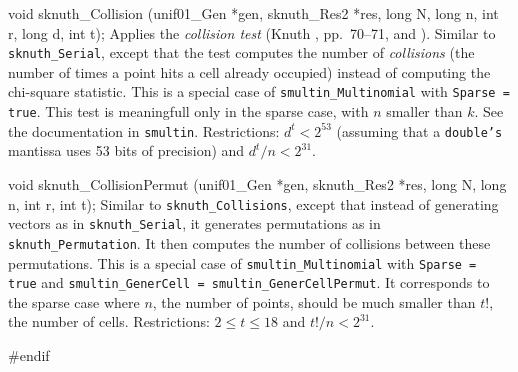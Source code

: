 void sknuth_Collision (unif01_Gen *gen, sknuth_Res2 *res,
                       long N, long n, int r, long d, int t);
\endcode
  \tab
   Applies the {\em collision test\/}
  (Knuth \cite{rKNU98a},  pp.~70--71, and \cite{rLEC02c}).
   Similar to {\tt sknuth\_Serial}, except that the test computes the
   number of {\em collisions\/} (the number of times a point hits a cell
   already occupied) instead of computing the chi-square statistic.
   This is a special case of {\tt smultin\_Multinomial} with
   {\tt Sparse = true}.  This test is meaningfull only in the sparse case,
   with $n$ smaller than $k$.  See the documentation in {\tt smultin}.
   Restrictions: $d^t < 2^{53}$ (assuming that a {\tt double's} mantissa
   uses 53 bits of precision) and $d^{t}/n < 2^{31}$.
  \endtab
\code


void sknuth_CollisionPermut (unif01_Gen *gen, sknuth_Res2 *res,
                             long N, long n, int r, int t);
\endcode
  \tab
   Similar to {\tt sknuth\_Collisions},
   except that
   instead of generating  vectors as in {\tt sknuth\_Serial},
   it generates permutations as in {\tt sknuth\_Permutation}.
   It then computes the number of collisions between these permutations.
   This is a special case of {\tt smultin\_Multinomial} with
   {\tt Sparse = true} and
  {\tt smultin\_Gener\-Cell = smultin\_GenerCellPermut}.
   It corresponds to the sparse case where $n$, the number of points,
   should be much smaller than  $t!$, the number of cells.
   Restrictions: $2 \le t \le 18 $ and $ t!/n < 2^{31}$.
  \endtab

\code
\hide
#endif
\endhide
\endcode



